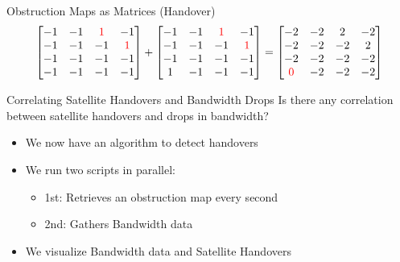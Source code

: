 \documentclass[NET,english,beameralt]{tumbeamer}
\begin{document}
\begin{frame}{Obstruction Maps as Matrices (Handover)}
    $$\begin{bmatrix}
        -1 & -1 & \color{red}1 &           -1          \\
        -1 & -1 &           -1 & \color{red}1          \\
        -1 & -1 &           -1 &           -1          \\
        -1 & -1 &           -1 &           -1          \\
    \end{bmatrix}
    +
    \begin{bmatrix}
        -1 & -1 & \color{red}1 &           -1          \\
        -1 & -1 &           -1 & \color{red}1          \\
        -1 & -1 &           -1 &           -1          \\
        1 & -1 &            -1 &           -1          \\
    \end{bmatrix}
    =
    \begin{bmatrix}
        -2           & -2 & 2 &  -2                    \\
        -2           & -2 & -2 &  2                    \\
        -2           & -2 & -2 & -2                    \\
        \color{red}0 & -2 & -2 & -2                    \\
    \end{bmatrix}$$
\end{frame}

\begin{frame}[fragile]{Correlating Satellite Handovers and Bandwidth Drops}
    Is there any correlation between satellite handovers and drops in bandwidth?
    \begin{itemize}
        \item We now have an algorithm to detect handovers
        \item We run two scripts in parallel:
            \begin{itemize}
                \item 1st: Retrieves an obstruction map every second
                \item 2nd: Gathers Bandwidth data
            \end{itemize} 
        \item We visualize Bandwidth data and Satellite Handovers 
    \end{itemize}
\end{frame}
\end{document}
